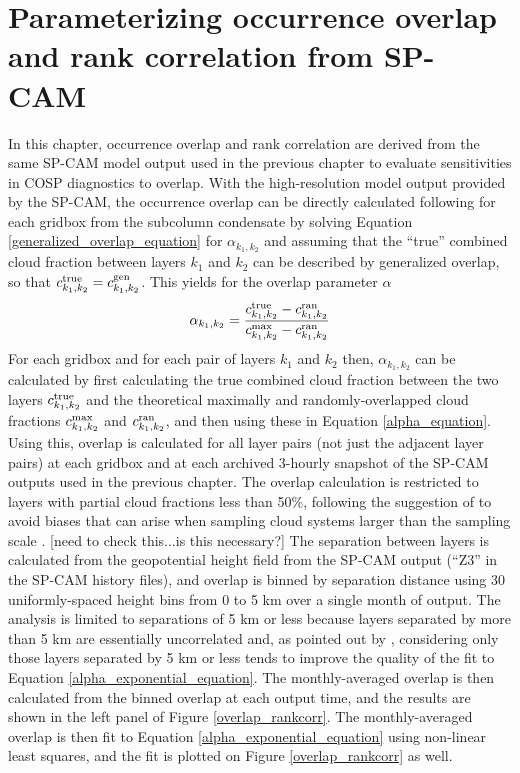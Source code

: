 \section{Parameterizing occurrence overlap and rank correlation from SP-CAM}
\label{subgrid2_overlap_section}
In this chapter, occurrence overlap and rank correlation are derived from the same SP-CAM model output used in the previous chapter to evaluate sensitivities in COSP diagnostics to overlap. With the high-resolution model output provided by the SP-CAM, the occurrence overlap can be directly calculated following \cite{pincus_et_al_2005} for each gridbox from the subcolumn condensate by solving Equation \ref{generalized_overlap_equation} for $\alpha_{k_1, k_2}$ and assuming that the ``true'' combined cloud fraction between layers $k_1$ and $k_2$ can be described by generalized overlap, so that $c^{\rm true}_{k_1, k_2} = c^{\rm gen}_{k_1, k_2}$. This yields for the overlap parameter $\alpha$
\begin{gather}
    \alpha_{k_1, k_2} = \frac{
        c^{\rm true}_{k_1, k_2} - c^{\rm ran}_{k_1, k_2}
    }{
        c^{\rm max}_{k_1, k_2} - c^{\rm ran}_{k_1, k_2}
    }
    \label{alpha_equation}
\end{gather}
For each gridbox and for each pair of layers $k_1$ and $k_2$ then, $\alpha_{k_1, k_2}$ can be calculated by first calculating the true combined cloud fraction between the two layers $c^{\rm true}_{k_1, k_2}$ and the theoretical maximally and randomly-overlapped cloud fractions $c^{\rm max}_{k_1, k_2}$ and $c^{\rm ran}_{k_1, k_2}$, and then using these in Equation \ref{alpha_equation}. Using this, overlap is calculated for all layer pairs (not just the adjacent layer pairs) at each gridbox and at each archived 3-hourly snapshot of the SP-CAM outputs used in the previous chapter. The overlap calculation is restricted to layers with partial cloud fractions less than 50\%, following the suggestion of \cite{tompkins_and_digiuseppe_2015} to avoid biases that can arise when sampling cloud systems larger than the sampling scale \citep[e.g.,][]{astin_and_digirolamo_2014, tompkins_and_digiuseppe_2015}. [need to check this...is this necessary?] The separation between layers is calculated from the geopotential height field from the SP-CAM output (``Z3'' in the SP-CAM history files), and overlap is binned by separation distance using 30 uniformly-spaced height bins from 0 to 5 km over a single month of output. The analysis is limited to separations of 5 km or less because layers separated by more than 5 km are essentially uncorrelated and, as pointed out by \cite{pincus_et_al_2005}, considering only those layers separated by 5 km or less tends to improve the quality of the fit to Equation \ref{alpha_exponential_equation}. The monthly-averaged overlap is then calculated from the binned overlap at each output time, and the results are shown in the left panel of Figure \ref{overlap_rankcorr}. The monthly-averaged overlap is then fit to Equation \ref{alpha_exponential_equation} using non-linear least squares, and the fit is plotted on Figure \ref{overlap_rankcorr} as well. 

